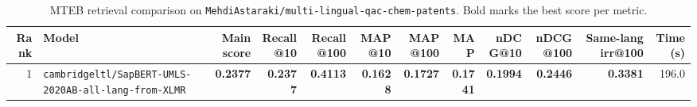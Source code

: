 \begin{table}[t]
\centering
\small
\begin{tabular}{r l r r r r r r r r r r}
\hline
Rank & Model & Main score & Recall@10 & Recall@100 & MAP@10 & MAP@100 & MAP & nDCG@10 & nDCG@100 & Same-lang irr@100 & Time (s) \\
\hline
1 & \texttt{cambridgeltl/SapBERT-UMLS-2020AB-all-lang-from-XLMR} & \textbf{0.2377} & \textbf{0.2377} & \textbf{0.4113} & \textbf{0.1628} & \textbf{0.1727} & \textbf{0.1741} & \textbf{0.1994} & \textbf{0.2446} & \textbf{0.3381} & 196.0 \\
\hline
\end{tabular}
\caption{MTEB retrieval comparison on \texttt{MehdiAstaraki/multi-lingual-qac-chem-patents}. Bold marks the best score per metric.}
\label{tab:mteb-model-comparison}
\end{table}

